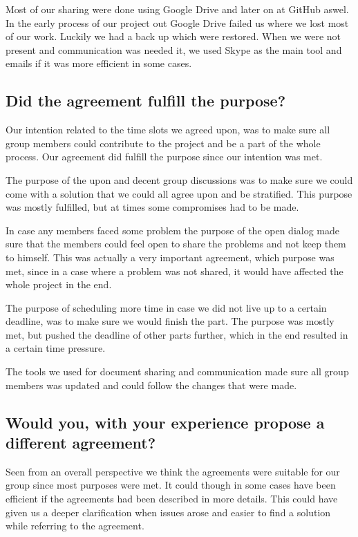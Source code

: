 Most of our sharing were done using Google Drive and later on at GitHub aswel. In the early process of our project out Google Drive failed us where we lost most of our work. Luckily we had a back up which were restored. 
When we were not present and communication was needed it, we used Skype as the main tool and emails if it was more efficient in some cases.

\subsection*{Did the agreement fulfill the purpose?}

Our intention related to the time slots we agreed upon, was to make sure all group members could contribute to the project and be a part of the whole process. Our agreement did fulfill the purpose since our intention was met.


The purpose of the upon and decent group discussions was to make sure we could come with a solution that we could all agree upon and be stratified. This purpose was mostly fulfilled, but at times some compromises had to be made.


In case any members faced some problem the purpose of the open dialog made sure that the members could feel open to share the problems and not keep them to himself. This was actually a very important agreement, which purpose was met, since in a case where a problem was not shared, it would have affected the whole project in the end.


The purpose of scheduling more time in case we did not live up to a certain deadline, was to make sure we would finish the part. The purpose was mostly met, but pushed the deadline of other parts further, which in the end resulted in a certain time pressure.


The tools we used for document sharing and communication made sure all group members was updated and could follow the changes that were made.


\subsection*{Would you, with your experience propose a different agreement?}


Seen from an overall perspective we think the agreements were suitable for our group since most purposes were met. It could though in some cases have been efficient if the agreements had been described in more details. This could have given us a deeper clarification when issues arose and easier to find a solution while referring to the agreement. 


